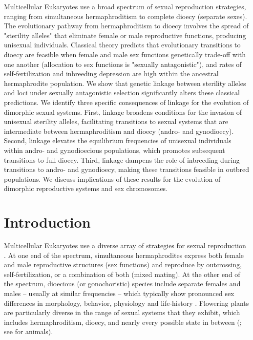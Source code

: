 \documentclass{article}
\begin{document}
\noindent{} Multicellular Eukaryotes use a broad spectrum of sexual reproduction strategies, ranging from simultaneous hermaphroditism to complete dioecy (separate sexes). The evolutionary pathway from hermaphroditism to dioecy involves the spread of "sterility alleles" that eliminate female or male reproductive functions, producing unisexual individuals. Classical theory predicts that evolutionary transitions to dioecy are feasible when female and male sex functions genetically trade-off with one another (allocation to sex functions is "sexually antagonistic"), and rates of self-fertilization and inbreeding depression are high within the ancestral hermaphrodite population. We show that genetic linkage between sterility alleles and loci under sexually antagonistic selection significantly alters these classical predictions. We identify three specific consequences of linkage for the evolution of dimorphic sexual systems. First, linkage broadens conditions for the invasion of unisexual sterility alleles, facilitating transitions to sexual systems that are intermediate between hermaphroditism and dioecy (andro- and gynodioecy). Second, linkage elevates the equilibrium frequencies of unisexual individuals within andro- and gynodioecious populations, which promotes subsequent transitions to full dioecy. Third, linkage dampens the role of inbreeding during transitions to andro- and gynodioecy, making these transitions feasible in outbred populations. We discuss implications of these results for the evolution of dimorphic reproductive systems and sex chromosomes.
\newpage{}


\section*{Introduction} \label{sec:Introduction}
Multicellular Eukaryotes use a diverse array of strategies for sexual reproduction \citep{Bachtrog2014}. At one end of the spectrum, simultaneous hermaphrodites express both female and male reproductive structures (sex functions) and reproduce by outcrossing, self-fertilization, or a combination of both (mixed mating). At the other end of the spectrum, dioecious (or gonochoristic) species include separate females and males -- usually at similar frequencies -- which typically show pronounced sex differences in morphology, behavior, physiology and life-history \citep{Andersson1994}. Flowering plants are particularly diverse in the range of sexual systems that they exhibit, which includes hermaphroditism, dioecy, and nearly every possible state in between (\citealt{Darwin1877, Westergaard1958, Bawa1980, SakaiWeller1999, Barrett2010, Renner2014, Bachtrog2014}; see \citealt{JarneAuld2006} for animals). 
\end{document}
